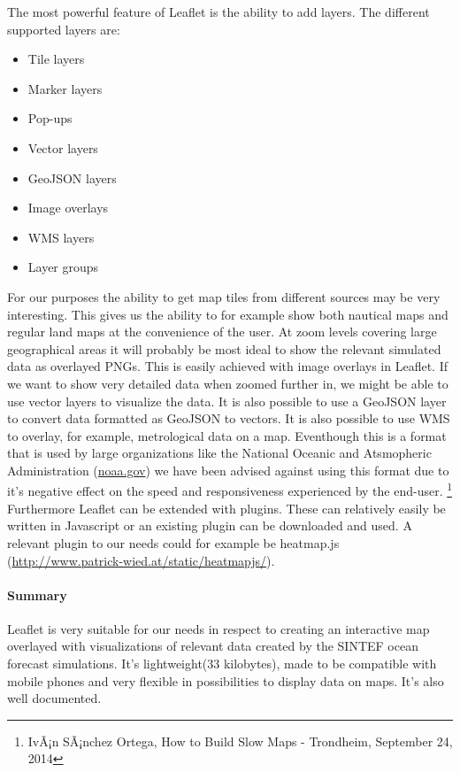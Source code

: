 \documentclass[11pt,a4paper,titlepage,oneside]{report}
\begin{document}
    The most powerful feature of Leaflet is the ability to add layers. The different supported layers are:

    \begin{itemize}
      \item Tile layers
      \item Marker layers
      \item Pop-ups
      \item Vector layers
      \item GeoJSON layers
      \item Image overlays
      \item \gls{WMS} layers
      \item Layer groups
    \end{itemize}

    For our purposes the ability to get map tiles from different sources may be very interesting. This gives us the ability to for example show both nautical maps and regular land maps at the convenience of the user. At zoom levels covering large geographical areas it will probably be most ideal to show the relevant simulated data as overlayed PNGs. This is easily achieved with image overlays in Leaflet. If we want to show very detailed data when zoomed further in, we might be able to use vector layers to visualize the data. It is also possible to use a GeoJSON layer to convert data formatted as GeoJSON to vectors.
    It is also possible to use \gls{WMS} to overlay, for example, metrological data on a map. Eventhough this is a format that is used by large organizations like the National Oceanic and Atsmopheric Administration (\url{noaa.gov}) we have been advised against using this format due to it's negative effect on the speed and responsiveness experienced by the end-user. \footnote{IvÃ¡n SÃ¡nchez Ortega, How to Build Slow Maps - Trondheim, September 24, 2014}
    Furthermore Leaflet can be extended with plugins. These can relatively easily be written in Javascript or an existing plugin can be downloaded and used. A relevant plugin to our needs could for example be heatmap.js (\url{http://www.patrick-wied.at/static/heatmapjs/}).

    \paragraph{Summary}
    Leaflet is very suitable for our needs in respect to creating an interactive map overlayed with visualizations of relevant data created by the SINTEF ocean forecast simulations. It's lightweight(33 kilobytes), made to be compatible with mobile phones and very flexible in possibilities to display data on maps. It's also well documented.
\end{document}
